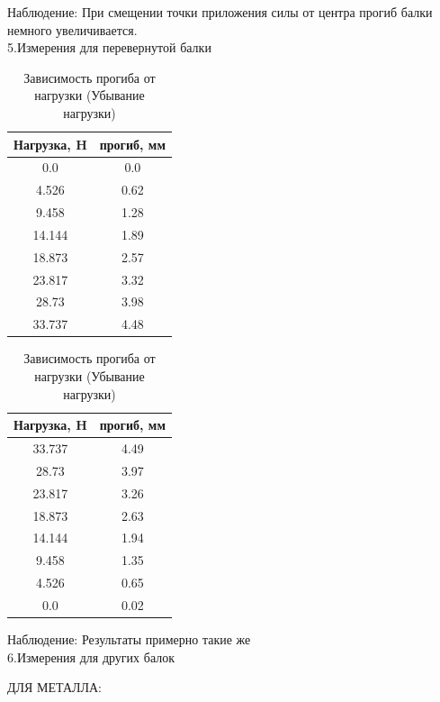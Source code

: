 \documentclass[a4paper, 12pt]{article}
\begin{document}
Наблюдение: При смещении точки приложения силы от центра прогиб балки немного увеличивается.
\\[1em]

5.Измерения для перевернутой балки

\begin{table}[h]
\centering
\begin{minipage}{0.45\textwidth}
\centering
\caption{Зависимость прогиба от нагрузки (Возрастание нагрузки)}
\begin{tabular}{|c|c|}
\hline
Нагрузка, H & прогиб, мм \\
\hline
0.0 & 0.0 \\
\hline
4.526 & 0.62 \\
\hline
9.458 & 1.28 \\
\hline
14.144 & 1.89 \\
\hline
18.873 & 2.57 \\
\hline
23.817 & 3.32 \\
\hline
28.73 & 3.98 \\
\hline
33.737 & 4.48 \\
\hline
\end{tabular}
\end{minipage}
\hfill
\begin{minipage}{0.45\textwidth}
\centering
\caption{Зависимость прогиба от нагрузки (Убывание нагрузки)}
\begin{tabular}{|c|c|}
\hline
Нагрузка, H & прогиб, мм \\
\hline
33.737 & 4.49 \\
\hline
28.73 & 3.97 \\
\hline
23.817 & 3.26 \\
\hline
18.873 & 2.63 \\
\hline
14.144 & 1.94 \\
\hline
9.458 & 1.35 \\
\hline
4.526 & 0.65 \\
\hline
0.0 & 0.02 \\
\hline
\end{tabular}
\end{minipage}
\end{table}

Наблюдение: Результаты примерно такие же\\[1em]


6.Измерения для других балок

ДЛЯ МЕТАЛЛА:
\end{document}

